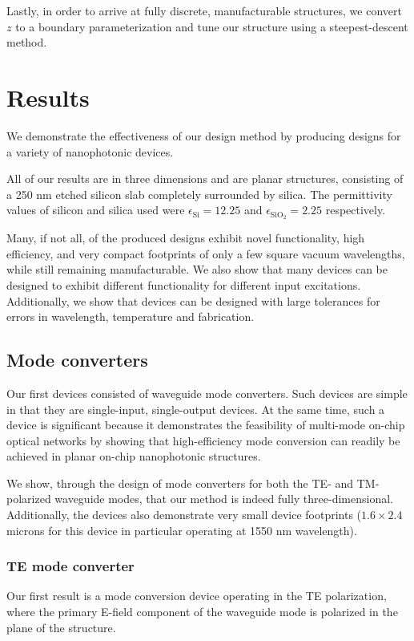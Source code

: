\documentclass[letterpaper,10pt]{article}
\begin{document}
Lastly, in order to arrive at fully discrete, manufacturable structures,
    we convert $z$ to a boundary parameterization\cite{levelset}
    and tune our structure using a steepest-descent method.

\section{Results}
We demonstrate the effectiveness of our design method 
    by producing designs for a variety of nanophotonic devices.

All of our results are in three dimensions
    and are planar structures, consisting of a 250 nm etched silicon slab
    completely surrounded by silica.
The permittivity values of silicon and silica used
    were $\epsilon_\text{Si} = 12.25$ and $\epsilon_\text{SiO$_2$} = 2.25$
    respectively.

Many, if not all, of the produced designs exhibit 
    novel functionality, high efficiency, and 
    very compact footprints of only a few square vacuum wavelengths,
    while still remaining manufacturable.
We also show that many devices can be designed
    to exhibit different functionality for different input excitations.
Additionally, we show that devices can be designed with large tolerances for
    errors in wavelength, temperature and fabrication.

\subsection{Mode converters}

Our first devices consisted of waveguide mode converters.
Such devices are simple in that they are single-input, single-output devices.
At the same time, such a device is significant because 
    it demonstrates the feasibility of multi-mode on-chip optical networks
    by showing that high-efficiency mode conversion 
    can readily be achieved in planar on-chip nanophotonic structures.

We show, through the design of mode converters for both the TE- and TM-polarized
    waveguide modes, 
    that our method is indeed fully three-dimensional.
Additionally, the devices also demonstrate very small device footprints 
    ($1.6 \times 2.4$ microns for this device in particular
    operating at 1550 nm wavelength).

\subsubsection{TE mode converter}
Our first result is a mode conversion device operating in the TE polarization,
    where the primary E-field component
    of the waveguide mode is polarized in the plane of the structure.
\end{document}
